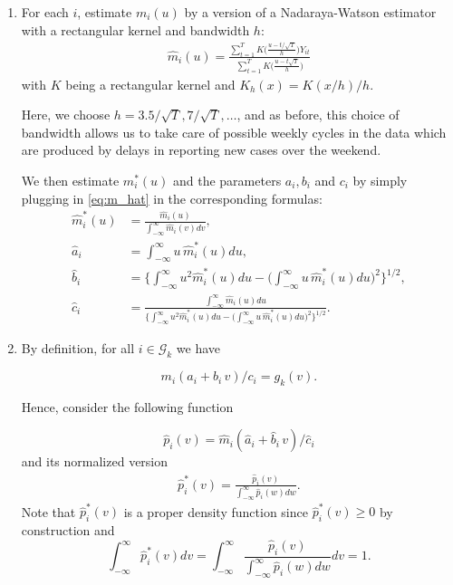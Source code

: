 \documentclass[a4paper,12pt]{article}
\numberwithin{equation}{section}
\begin{document}
\begin{enumerate}[label=\textit{Step \arabic*.},leftmargin=1.45cm]


\item For each $i$, estimate $m_i(u)$ by a version of a Nadaraya-Watson estimator with a rectangular kernel and bandwidth $h$:
\begin{align}\label{eq:m_hat}
\hat{m}_i(u) =  \frac{ \sum_{t=1}^T K\Big( \frac{u - t/\sqrt{T}}{h}\Big) Y_{it}}{\sum_{t=1}^T K\Big( \frac{u - t\sqrt{T}}{h}\Big)}
\end{align}
with $K$ being a rectangular kernel and $K_h(x) = K(x/h)/h$. 

Here, we choose $h = 3.5/\sqrt{T}, 7/\sqrt{T}, \ldots$, and as before, this choice of bandwidth allows us to take care of possible weekly cycles in the data which are produced by delays in reporting new cases over the weekend.

We then estimate $m_i^*(u)$ and the parameters $a_i, b_i$ and $c_i$ by simply plugging in \eqref{eq:m_hat} in the corresponding formulas:
\begin{align*}
\hat{m}_i^*(u) &= \frac{\hat{m}_i(u)}{\int_{-\infty}^\infty \hat{m}_i(v)dv}, \\
\hat{a}_i &= \int_{-\infty}^\infty u \, \hat{m}_i^*(u) du, \\
\hat{b}_i &= \bigg\{ \int_{-\infty}^\infty u^2 \hat{m}_i^*(u) du  - \Big(\int_{-\infty}^\infty u\, \hat{m}_i^*(u) du \Big)^2 \bigg\}^{1/2}, \\
\hat{c}_i & = \frac{\int_{-\infty}^\infty \hat{m}_i(u) du}{\Big\{ \int_{-\infty}^\infty u^2 \hat{m}_i^*(u) du  - \Big(\int_{-\infty}^\infty u\, \hat{m}_i^*(u) du \Big)^2 \Big\}^{1/2}}.
\end{align*}

\item By definition, for all $i \in \mathcal{G}_k$ we have

$$ m_i (a_i + b_i \, v)/c_i = g_k(v).$$

Hence, consider the following function

$$ \hat{p}_i(v) = \hat{m}_i (\hat{a}_i + \hat{b}_i \, v)/\hat{c}_i$$
and its normalized version
\begin{align} \label{eq:p_star_hat}
\hat{p}^*_i(v) = \frac{\hat{p}_i(v)}{\int_{-\infty}^{\infty} \hat{p}_i(w)dw}.
\end{align}
Note that  $\hat{p}^*_i(v)$ is a proper density function since $\hat{p}^*_i(v) \geq 0$ by construction and 
$$ \int_{-\infty}^{\infty} \hat{p}^*_i(v)dv = \int_{-\infty}^{\infty}\frac{\hat{p}_i(v)}{\int_{-\infty}^{\infty} \hat{p}_i(w)dw}dv = 1.$$


\end{enumerate}
\end{document}
